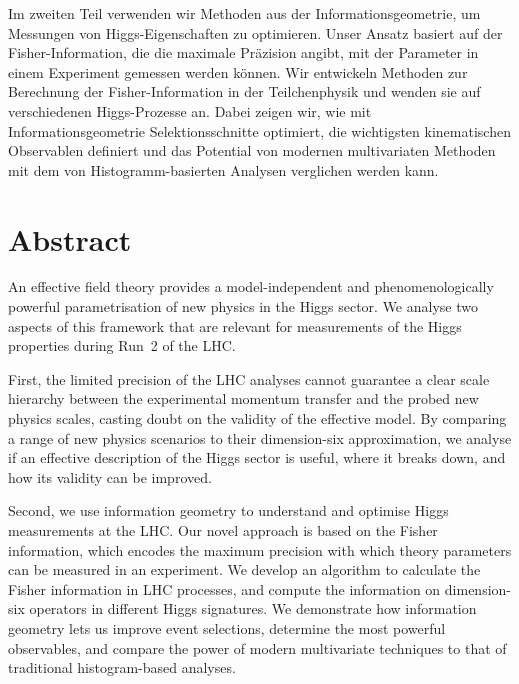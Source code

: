 Im zweiten Teil verwenden wir Methoden aus der Informationsgeometrie,
um Messungen von Higgs-Eigenschaften zu optimieren. Unser Ansatz
basiert auf der Fisher-Information, die die maximale Pr\"azision
angibt, mit der Parameter in einem Experiment gemessen werden
k\"onnen. Wir entwickeln Methoden zur Berechnung der
Fisher-Information in der Teilchenphysik und wenden sie auf
verschiedenen Higgs-Prozesse an. Dabei zeigen wir, wie mit
Informationsgeometrie Selektionsschnitte optimiert, die wichtigsten
kinematischen Observablen definiert und das Potential von modernen
multivariaten Methoden mit dem von Histogramm-basierten Analysen
verglichen werden kann.




\chapter*{Abstract}


An effective field theory provides a model-independent and
phenomenologically powerful parametrisation of new physics in the
Higgs sector. We analyse two aspects of this framework that are
relevant for measurements of the Higgs properties during Run~2 of the
LHC.

First, the limited precision of the LHC analyses cannot guarantee a
clear scale hierarchy between the experimental momentum transfer and
the probed new physics scales, casting doubt on the validity of the
effective model. By comparing a range of new physics scenarios to
their dimension-six approximation, we analyse if an effective
description of the Higgs sector is useful, where it breaks down, and
how its validity can be improved.

Second, we use information geometry to understand and optimise Higgs
measurements at the LHC. Our novel approach is based on the Fisher
information, which encodes the maximum
precision with which theory parameters can be measured in an
experiment. We develop an algorithm to calculate the Fisher
information in LHC processes, and compute the information on
dimension-six operators in different Higgs signatures.  We demonstrate
how information geometry lets us improve event selections, determine
the most powerful observables, and compare the power of modern
multivariate techniques to that of traditional histogram-based
analyses.
